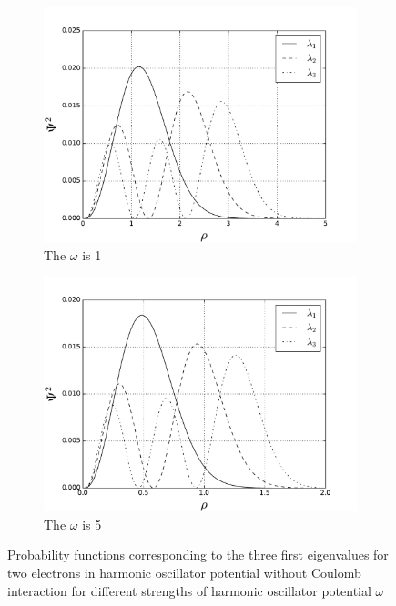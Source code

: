\documentclass[10pt]{article}
\begin{document}
\begin{figure}[h!]
\begin{subfigure}[b]{0.6\linewidth}
    \centering
    \includegraphics[width=1.1\linewidth]{two_1} 
    \caption{The $\omega$ is 1} 
    \label{fig1:c} 
  \end{subfigure}%
  \begin{subfigure}[b]{0.6\linewidth}
    \centering
    \includegraphics[width=1.1\linewidth]{two_5} 
    \caption{The $\omega$ is 5} 
    \label{fig1:d} 
  \end{subfigure} 
  \caption{ Probability functions corresponding to the three first eigenvalues for two electrons in harmonic oscillator potential without Coulomb interaction for different strengths of harmonic oscillator potential $\omega$}
  \label{fig1} 
\end{figure}
\end{document}
